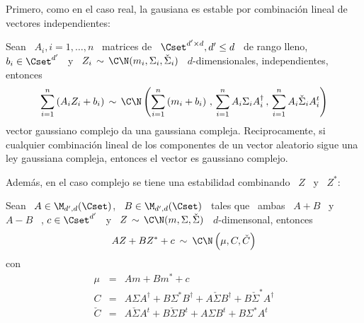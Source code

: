Primero, como en  el caso real, la gausiana es  estable por combinaci\'on lineal
de vectores independientes:
%
\begin{teorema}[Stabilidad]
\label{Teo:MP:StabilidadGaussianaCompleja}
%
Sean \ $A_i , i = 1,\ldots,n$ \  matrices de \ $\Cset^{d' \times d}, d' \le d$ \
de   rango   lleno,   $b_i  \in   \Cset^{d'}$   \   y   \   $Z_i  \,   \sim   \,
\C\N(m_i,\Sigma_i,\check{\Sigma}_i)$    \   $d$-dimensionales,   independientes,
entonces
  \[
  \sum_{i=1}^n \left( A_i  Z_i + b_i \right) \,  \sim \, \C\N\left( \sum_{i=1}^n
    \left( m_i + b_i \right) \, ,  \, \sum_{i=1}^n A_i \Sigma_i A_i^\dag \, , \,
    \sum_{i=1}^n A_i \check{\Sigma}_i A_i^t \right)
  \]
  vector  gaussiano  complejo da  una  gaussiana  compleja.  Reciprocamente,  si
  cualquier combinaci\'on lineal de los componentes de un vector aleatorio sigue
  una ley gaussiana compleja, entonces el vector es gaussiano complejo.
\end{teorema}
%
Adem\'as, en el  caso complejo se tiene  una estabilidad combinando \ $Z$  \ y \
$Z^*$:
%
\begin{teorema}%
\label{Teo:MP:StabilidadGaussianaComplejaZZestrella}
%
Sean \ $A \in \M_{d',d}(\Cset)$, \  $B \in \M_{d',d}(\Cset)$ \ tales que \ ambas
\ $A+B$ \ y \  $A-B$ \ , $c \in \Cset^{d'}$  \ y \ $Z \,
\sim \, \C\N(m,\Sigma,\check{\Sigma})$ \ $d$-dimensonal, entonces
  \[
  A Z + B Z^* + c \: \sim \: \C\N\left( \mu , C , \check{C}  \right)
  \]
  con
  \[
  \begin{array}{lll}
  \mu & = & A m + B m^* + c\\[2.5mm]
  C & = & A \Sigma A^\dag + B \Sigma^* B^\dag + A \check{\Sigma} B^\dag + B
  \check{\Sigma}^* A^\dag\\[2.5mm]
  \check{C} & = & A \check{\Sigma} A^t + B \check{\Sigma} B^t + A \Sigma B^t + B
  \Sigma^* A^t
  \end{array}
  \]
\end{teorema}
